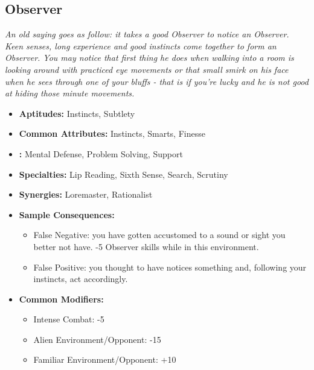  \subsection{Observer}\label{Observer}
 \textit{An old saying goes as follow: it takes a good Observer to notice an Observer.
Keen senses, long experience and good instincts come together to form an Observer.
You may notice that first thing he does when walking into a room is looking around with practiced eye movements or that small smirk on his face when he sees through one of your bluffs - that is if you're lucky and he is not good at hiding those minute movements.}
 \begin{itemize}
 	\item \textbf{Aptitudes:} Instincts, Subtlety
 	\item \textbf{Common Attributes:} Instincts, Smarts, Finesse
 	\item \textbf{:} Mental Defense, Problem Solving, Support
 	\item \textbf{Specialties:} Lip Reading, Sixth Sense, Search, Scrutiny
 	\item \textbf{Synergies:} Loremaster, Rationalist
 	\item \textbf{Sample Consequences:} 
 	\begin{itemize}
 		\item False Negative: you have gotten accustomed to a sound or sight you better not have. -5 Observer skills while in this environment.
 		\item False Positive: you thought to have notices something and, following your instincts, act accordingly.
 	\end{itemize}
 	\item \textbf{Common Modifiers:}
 	\begin{itemize}
 		\item Intense Combat: -5
 		\item Alien Environment/Opponent: -15
 		\item Familiar Environment/Opponent: +10
 	\end{itemize}
 \end{itemize}

